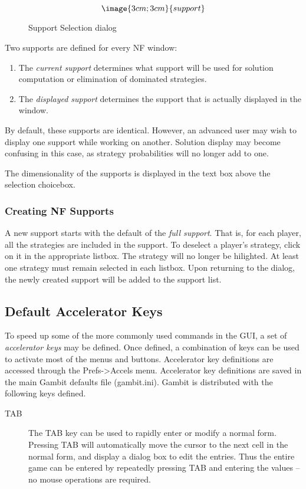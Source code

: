 {\begin{figure}
$$\image{3cm;3cm}{support}$$
\caption{Support Selection dialog}\label{fig_support}
\end{figure}

Two supports are defined for every NF window:
\begin{enumerate}
\item The {\em current support} determines what support will be used for 
solution computation or elimination of dominated strategies. 
\item The {\em displayed support} determines the support  
that is actually displayed in the window.
\end{enumerate}
By default, these supports are identical.  However, an advanced user may wish to
display one support while working on another.  Solution display may become 
confusing in this case, as strategy probabilities will no longer add to one.  

The dimensionality of the supports is displayed in the text box above the selection
choicebox.

\subsubsection{Creating NF Supports}\label{NewSupport}
A new support starts with the default of the {\em full support}.  That is, for 
each player,
all the strategies are included in the support.  To deselect a player's 
strategy, click on it
in the appropriate listbox.  The strategy will no longer be hilighted.  At 
least one strategy
must remain selected in each listbox.  Upon returning to the 
 dialog, the newly created 
support will be added to the support list.

\subsection{Default Accelerator Keys}\label{NormFormDefAccl}
To speed up some of the more commonly used commands in the GUI, a set of 
{\em accelerator keys} may be defined.  Once defined, a combination of keys
can be used to activate most of the menus and buttons.  Accelerator key
definitions are accessed through the Prefs->Accels menu.  Accelerator key
definitions are saved in the main Gambit defaults file (gambit.ini).  Gambit
is distributed with the following keys defined.
\begin{description}
\item[TAB] The TAB key can be used to rapidly enter or modify a normal form.
Pressing TAB will automatically move
the cursor to the next cell in the normal form, and display a dialog box to 
edit the entries.  Thus the entire
game can be entered by repeatedly pressing TAB and entering the values --
no mouse operations are required.
\end{description}

}
